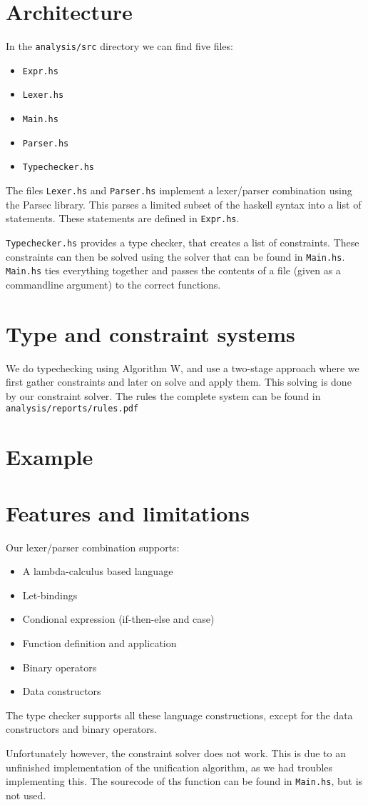 \documentclass[10pt]{article}
\title{}
\author{Frank Dedden \and Wilco Kusee}
\begin{document}
\maketitle

\section{Architecture}
In the \texttt{analysis/src} directory we can find five files:
\begin{itemize}
	\item \texttt{Expr.hs}
	\item \texttt{Lexer.hs}
	\item \texttt{Main.hs}
	\item \texttt{Parser.hs}
	\item \texttt{Typechecker.hs}
\end{itemize}
The files \texttt{Lexer.hs} and \texttt{Parser.hs} implement a lexer/parser combination using the Parsec library. This parses a limited subset of the haskell syntax into a list of statements. These statements are defined in \texttt{Expr.hs}.

\texttt{Typechecker.hs} provides a type checker, that creates a list of constraints. These constraints can then be solved using the solver that can be found in \texttt{Main.hs}. \texttt{Main.hs} ties everything together and passes the contents of a file (given as a commandline argument) to the correct functions.

\section{Type and constraint systems}
We do typechecking using Algorithm W, and use a two-stage approach where we first gather constraints and later on solve and apply them. This solving is done by our constraint solver. The rules the complete system can be found in \texttt{analysis/reports/rules.pdf}

\section{Example}


\section{Features and limitations}
Our lexer/parser combination supports:
\begin{itemize}
	\item A lambda-calculus based language
	\item Let-bindings
	\item Condional expression (if-then-else and case)
	\item Function definition and application
	\item Binary operators
	\item Data constructors
\end{itemize}
The type checker supports all these language constructions, except for the data constructors and binary operators.

Unfortunately however, the constraint solver does not work. This is due to an unfinished implementation of the unification algorithm, as we had troubles implementing this. The sourecode of ths function can be found in \texttt{Main.hs}, but is not used.
\end{document}
